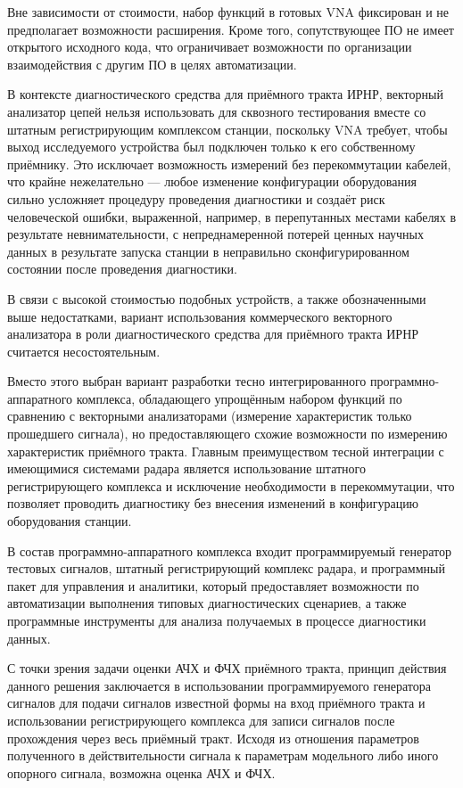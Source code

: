 \documentclass{report}
\begin{document}
Вне зависимости от стоимости, набор функций в готовых VNA фиксирован и не предполагает возможности расширения. Кроме того, сопутствующее ПО не имеет открытого исходного кода, что ограничивает возможности по организации взаимодействия с другим ПО в целях автоматизации.

В контексте диагностического средства для приёмного тракта ИРНР, векторный анализатор цепей нельзя использовать для сквозного тестирования вместе со штатным регистрирующим комплексом станции, поскольку VNA требует, чтобы выход исследуемого устройства был подключен только к его собственному приёмнику. Это исключает возможность измерений без перекоммутации кабелей, что крайне нежелательно --- любое изменение конфигурации оборудования сильно усложняет процедуру проведения диагностики и создаёт риск человеческой ошибки, выраженной, например, в перепутанных местами кабелях в результате невнимательности, с непреднамеренной потерей ценных научных данных в результате запуска станции в неправильно сконфигурированном состоянии после проведения диагностики.

В связи с высокой стоимостью подобных устройств, а также обозначенными выше недостатками, вариант использования коммерческого векторного анализатора в роли диагностического средства для приёмного тракта ИРНР считается несостоятельным.

Вместо этого выбран вариант разработки тесно интегрированного программно-аппаратного комплекса, обладающего упрощённым набором функций по сравнению с векторными анализаторами (измерение характеристик только прошедшего сигнала), но предоставляющего схожие возможности по измерению характеристик приёмного тракта. Главным преимуществом тесной интеграции с имеющимися системами радара является использование штатного регистрирующего комплекса и исключение необходимости в перекоммутации, что позволяет проводить диагностику без внесения изменений в конфигурацию оборудования станции.

В состав программно-аппаратного комплекса входит программируемый генератор тестовых сигналов, штатный регистрирующий комплекс радара, и программный пакет для управления и аналитики, который предоставляет возможности по автоматизации выполнения типовых диагностических сценариев, а также программные инструменты для анализа получаемых в процессе диагностики данных.

С точки зрения задачи оценки АЧХ и ФЧХ приёмного тракта, принцип действия данного решения заключается в использовании программируемого генератора сигналов для подачи сигналов известной формы на вход приёмного тракта и использовании регистрирующего комплекса для записи сигналов после прохождения через весь приёмный тракт. Исходя из отношения параметров полученного в действительности сигнала к параметрам модельного либо иного опорного сигнала, возможна оценка АЧХ и ФЧХ.
\end{document}
